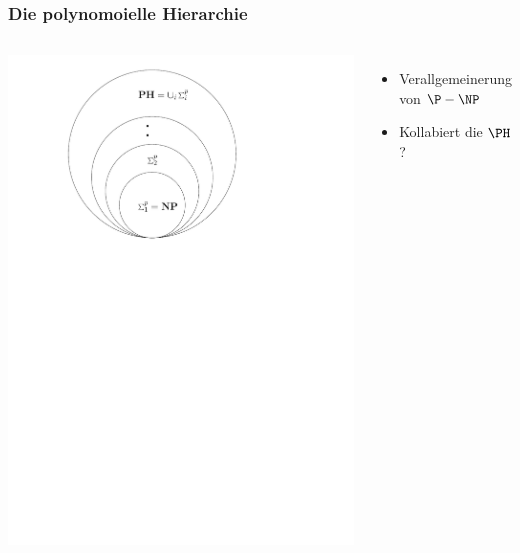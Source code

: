 \begin{frame}
	\frametitle{Die polynomoielle Hierarchie}
	\begin{columns}
		\includegraphics[scale = 0.4]{images/polyhierarchy.pdf}
		\begin{itemize}[<+->]
			\item Verallgemeinerung von $\P-\NP$
			\item Kollabiert die $\PH$?
		\end{itemize}
	\end{columns}	
	\end{frame}
	
	